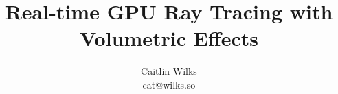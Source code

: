 \documentclass[12pt]{ociamthesis}
\title{Real-time GPU Ray Tracing with Volumetric Effects}
\author{Caitlin Wilks\\cat@wilks.so}
\begin{document}


\begin{romanpages}

\maketitle



\tableofcontents
\newpage
\listoffigures

\end{romanpages}

\begin{onehalfspacing}


\end{onehalfspacing}

\cleardoublepage
{}
{}

\printbibliography

\cleardoublepage
{}

\renewcommand\thesection{Appendix \Alph{section}}
\renewcommand\thesubsection{\arabic{subsection}}

\appendix


\end{document}
